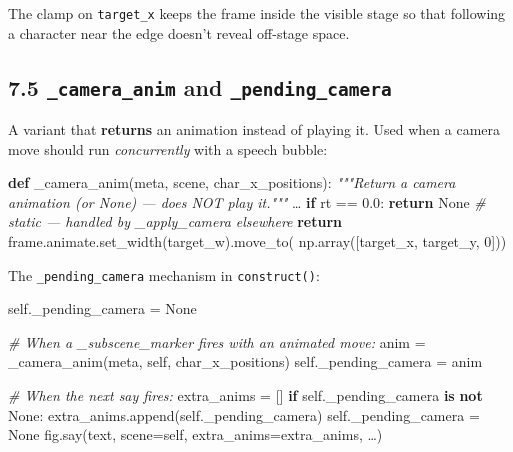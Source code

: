 \documentclass[
  12pt,
  letterpaper,
]{book}
\newenvironment{Shaded}{}{}
\newcommand{\CommentTok}[1]{\textcolor[rgb]{0.38,0.63,0.69}{\textit{#1}}}
\newcommand{\ControlFlowTok}[1]{\textcolor[rgb]{0.00,0.44,0.13}{\textbf{#1}}}
\newcommand{\DecValTok}[1]{\textcolor[rgb]{0.25,0.63,0.44}{#1}}
\newcommand{\FloatTok}[1]{\textcolor[rgb]{0.25,0.63,0.44}{#1}}
\newcommand{\KeywordTok}[1]{\textcolor[rgb]{0.00,0.44,0.13}{\textbf{#1}}}
\newcommand{\NormalTok}[1]{#1}
\newcommand{\OperatorTok}[1]{\textcolor[rgb]{0.40,0.40,0.40}{#1}}
\newcommand{\VariableTok}[1]{\textcolor[rgb]{0.10,0.09,0.49}{#1}}
\begin{document}
The clamp on \texttt{target\_x} keeps the frame inside the visible stage
so that following a character near the edge doesn't reveal off-stage
space.

\subsection{\texorpdfstring{7.5 \texttt{\_camera\_anim} and
\texttt{\_pending\_camera}}{7.5 \_camera\_anim and \_pending\_camera}}\label{camera_anim-and-_pending_camera}

A variant that \textbf{returns} an animation instead of playing it. Used
when a camera move should run \emph{concurrently} with a speech bubble:

\begin{Shaded}
\begin{Highlighting}[]
\KeywordTok{def}\NormalTok{ \_camera\_anim(meta, scene, char\_x\_positions):}
    \CommentTok{"""Return a camera animation (or None) — does NOT play it."""}
\NormalTok{    …}
    \ControlFlowTok{if}\NormalTok{ rt }\OperatorTok{==} \FloatTok{0.0}\NormalTok{:}
        \ControlFlowTok{return} \VariableTok{None}    \CommentTok{\# static — handled by \_apply\_camera elsewhere}
    \ControlFlowTok{return}\NormalTok{ frame.animate.set\_width(target\_w).move\_to(}
\NormalTok{        np.array([target\_x, target\_y, }\DecValTok{0}\NormalTok{]))}
\end{Highlighting}
\end{Shaded}

The \texttt{\_pending\_camera} mechanism in \texttt{construct()}:

\begin{Shaded}
\begin{Highlighting}[]
\VariableTok{self}\NormalTok{.\_pending\_camera }\OperatorTok{=} \VariableTok{None}

\CommentTok{\# When a \_subscene\_marker fires with an animated move:}
\NormalTok{anim }\OperatorTok{=}\NormalTok{ \_camera\_anim(meta, }\VariableTok{self}\NormalTok{, char\_x\_positions)}
\VariableTok{self}\NormalTok{.\_pending\_camera }\OperatorTok{=}\NormalTok{ anim}

\CommentTok{\# When the next \textasciigrave{}say\textasciigrave{} fires:}
\NormalTok{extra\_anims }\OperatorTok{=}\NormalTok{ []}
\ControlFlowTok{if} \VariableTok{self}\NormalTok{.\_pending\_camera }\KeywordTok{is} \KeywordTok{not} \VariableTok{None}\NormalTok{:}
\NormalTok{    extra\_anims.append(}\VariableTok{self}\NormalTok{.\_pending\_camera)}
    \VariableTok{self}\NormalTok{.\_pending\_camera }\OperatorTok{=} \VariableTok{None}
\NormalTok{fig.say(text, scene}\OperatorTok{=}\VariableTok{self}\NormalTok{, extra\_anims}\OperatorTok{=}\NormalTok{extra\_anims, …)}
\end{Highlighting}
\end{Shaded}
\end{document}
